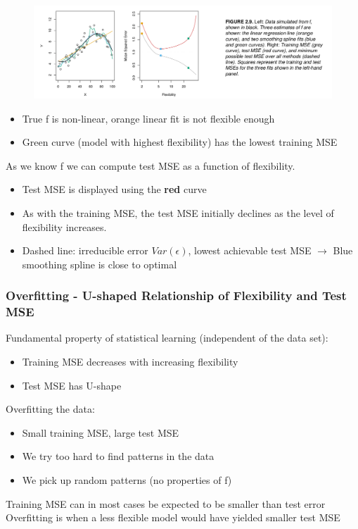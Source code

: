 \documentclass{beamer}
\begin{document}
\begin{frame}
\frametitle{}
\begin{figure}
\includegraphics[width = 1\linewidth]{figures/03/figure_2_6.png}
\end{figure}
\begin{itemize}
\item True f is non-linear, orange linear fit is not flexible enough
\item Green curve (model with highest flexibility) has the lowest training MSE
\end{itemize}
As we know f we can compute test MSE as a function of flexibility.
\begin{itemize}
\item Test MSE is displayed using the \textbf{red} curve
\item As with the training MSE, the test MSE initially declines as the level of
flexibility increases.
\item Dashed line: irreducible error $Var(\epsilon)$, lowest achievable test MSE $\rightarrow$ Blue smoothing spline is close to optimal
\end{itemize}

\end{frame}

\begin{frame}
\frametitle{Overfitting - U-shaped Relationship of Flexibility and Test MSE}
Fundamental property of statistical learning
(independent of the data set):
\begin{itemize}
\item Training MSE decreases with increasing flexibility
\item Test MSE has U-shape
\end{itemize}
\bigskip
Overfitting the data:
\begin{itemize}
\item Small training MSE, large test MSE
\item We try too hard to find patterns in the data
\item We pick up random patterns (no properties of f)
\end{itemize}
\bigskip
Training MSE can in most cases be expected to
be smaller than test error
Overfitting is when a less flexible model would
have yielded smaller test MSE
\end{frame}
\end{document}
